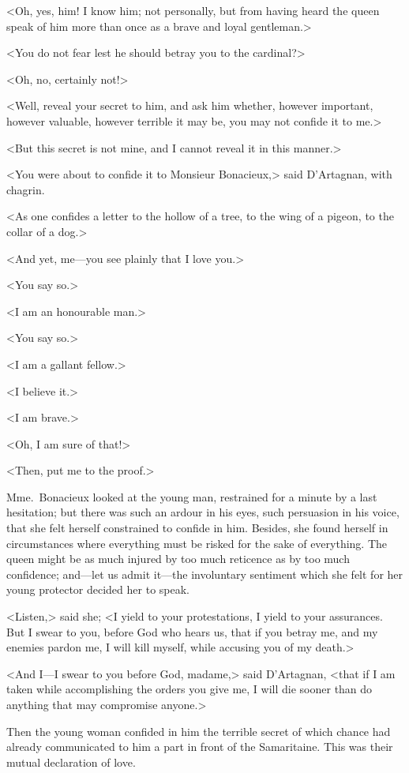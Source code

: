 <Oh, yes, him! I know him; not personally, but from having heard the queen speak of him more than once as a brave and loyal gentleman.> 

<You do not fear lest he should betray you to the cardinal?> 

<Oh, no, certainly not!> 

<Well, reveal your secret to him, and ask him whether, however important, however valuable, however terrible it may be, you may not confide it to me.> 

<But this secret is not mine, and I cannot reveal it in this manner.> 

<You were about to confide it to Monsieur Bonacieux,> said D'Artagnan, with chagrin. 

<As one confides a letter to the hollow of a tree, to the wing of a pigeon, to the collar of a dog.> 

<And yet, me—you see plainly that I love you.> 

<You say so.> 

<I am an honourable man.> 

<You say so.> 

<I am a gallant fellow.> 

<I believe it.> 

<I am brave.> 

<Oh, I am sure of that!> 

<Then, put me to the proof.> 

Mme.~Bonacieux looked at the young man, restrained for a minute by a last hesitation; but there was such an ardour in his eyes, such persuasion in his voice, that she felt herself constrained to confide in him. Besides, she found herself in circumstances where everything must be risked for the sake of everything. The queen might be as much injured by too much reticence as by too much confidence; and—let us admit it—the involuntary sentiment which she felt for her young protector decided her to speak. 

<Listen,> said she; <I yield to your protestations, I yield to your assurances. But I swear to you, before God who hears us, that if you betray me, and my enemies pardon me, I will kill myself, while accusing you of my death.> 

<And I—I swear to you before God, madame,> said D'Artagnan, <that if I am taken while accomplishing the orders you give me, I will die sooner than do anything that may compromise anyone.> 

Then the young woman confided in him the terrible secret of which chance had already communicated to him a part in front of the Samaritaine. This was their mutual declaration of love. 

